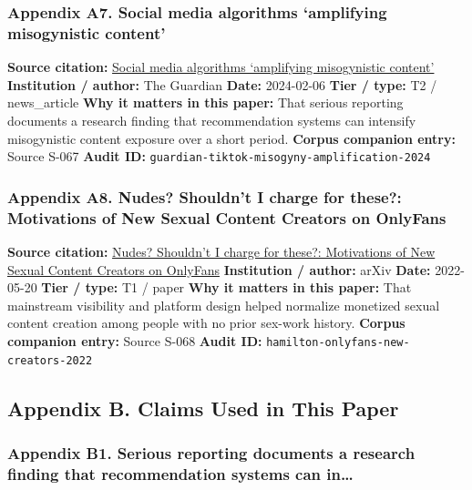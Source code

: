\documentclass[
  american,
  11pt,
  letterpaper,
]{article}
\begin{document}
\subsubsection{Appendix A7. Social media algorithms `amplifying
misogynistic
content'}\label{appendix-a7-social-media-algorithms-amplifying-misogynistic-content}

\textbf{Source citation:}
\href{https://www.theguardian.com/media/2024/feb/06/social-media-algorithms-amplifying-misogynistic-content}{Social
media algorithms `amplifying misogynistic content'} \textbf{Institution
/ author:} The Guardian \textbf{Date:} 2024-02-06 \textbf{Tier / type:}
T2 / news\_article \textbf{Why it matters in this paper:} That serious
reporting documents a research finding that recommendation systems can
intensify misogynistic content exposure over a short period.
\textbf{Corpus companion entry:} Source S-067 \textbf{Audit ID:}
\texttt{guardian-tiktok-misogyny-amplification-2024}

\subsubsection{Appendix A8. Nudes? Shouldn't I charge for these?:
Motivations of New Sexual Content Creators on
OnlyFans}\label{appendix-a8-nudes-shouldn-t-i-charge-for-these-motivations-of-new-sexual-content-creators-on-onlyfans}

\textbf{Source citation:} \href{https://arxiv.org/abs/2205.10425}{Nudes?
Shouldn't I charge for these?: Motivations of New Sexual Content
Creators on OnlyFans} \textbf{Institution / author:} arXiv
\textbf{Date:} 2022-05-20 \textbf{Tier / type:} T1 / paper \textbf{Why
it matters in this paper:} That mainstream visibility and platform
design helped normalize monetized sexual content creation among people
with no prior sex-work history. \textbf{Corpus companion entry:} Source
S-068 \textbf{Audit ID:} \texttt{hamilton-onlyfans-new-creators-2022}

\subsection{Appendix B. Claims Used in This
Paper}\label{appendix-b.-claims-used-in-this-paper}

\subsubsection{Appendix B1. Serious reporting documents a research
finding that recommendation systems can
in\ldots{}}\label{appendix-b1-serious-reporting-documents-a-research-finding-that-recommendation-systems-can-in}
\end{document}
